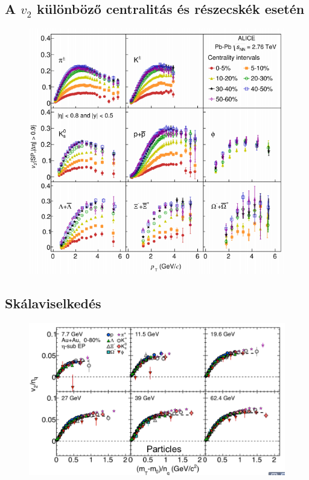 \documentclass{beamer}
\begin{document}
\subsection{A $v_2$ különböző centralitás és részecskék esetén}
\begin{frame}
\begin{center}
\begin{figure}[H]
	\centering
    		\includegraphics[scale=0.4]{pic/cent}
\end{figure}
\end{center}
\end{frame}


\subsection{Skálaviselkedés}
\begin{frame}
\begin{center}
\begin{figure}[H]
	\centering
    		\includegraphics[scale=0.3]{pic/vn_nq}
\end{figure}
\end{center}
\end{frame}
\end{document}
